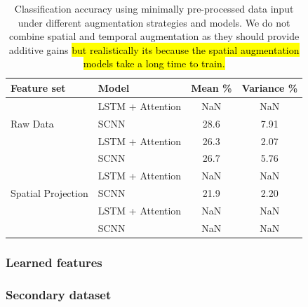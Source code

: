 \documentclass[utf8]{frontiersSCNS} %
\begin{document}
\begin{table}[t]
  \centering
  \label{tab:end2end_results}
  \begin{tabular}{l l | c | c}
    \toprule
    \textbf{Feature set} & \textbf{Model} & \textbf{Mean \%} & \textbf{Variance \%} \\
    \toprule
    \multirow{3}{*}{Raw Data}
                         & LSTM + Attention    & NaN & NaN  \\ 
                         & SCNN                & 28.6 & 7.91  \\
    \midrule
    \multirow{3}{*}{Temporal Augmentation}
                         & LSTM + Attention    & 26.3 & 2.07  \\ 
                         & SCNN                & 26.7 & 5.76  \\
    \midrule
    \multirow{3}{*}{Spatial Projection}
                         & LSTM + Attention    & NaN & NaN  \\ 
                         & SCNN                & 21.9 & 2.20  \\
    \midrule
    \multirow{3}{*}{Spatial Augmentation}
                         & LSTM + Attention    & NaN & NaN  \\ 
                         & SCNN                & NaN & NaN  \\
    
    \bottomrule
  \end{tabular}
  \caption{Classification accuracy using minimally pre-processed data input under different augmentation strategies and models. We do not combine spatial and temporal augmentation as they should provide additive gains \hl{but realistically its because the spatial augmentation models take a long time to train.}}
\end{table}

\subsubsection{Learned features}

\subsubsection{Secondary dataset}
\end{document}
